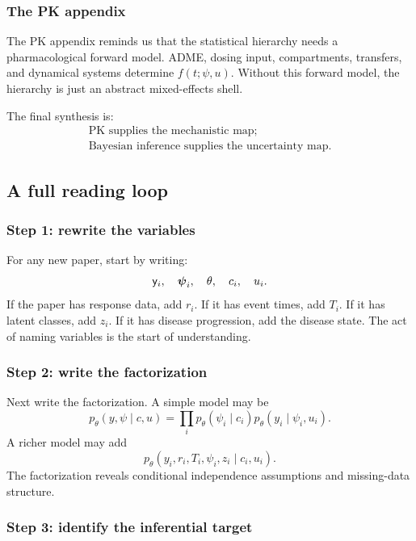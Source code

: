\subsubsection*{The PK appendix}

The PK appendix reminds us that the statistical hierarchy needs a pharmacological forward model.  ADME, dosing input, compartments, transfers, and dynamical systems determine \(f(t;\psi,u)\).  Without this forward model, the hierarchy is just an abstract mixed-effects shell.

The final synthesis is:
\[
  \begin{array}{c}
    \text{PK supplies the mechanistic map;}\\
    \text{Bayesian inference supplies the uncertainty map.}
  \end{array}
\]

\subsection{A full reading loop}

\subsubsection*{Step 1: rewrite the variables}

For any new paper, start by writing:
\[
  \mathsf{y}_i,\quad \boldsymbol{\psi}_i,\quad \theta,\quad c_i,\quad u_i.
\]
If the paper has response data, add \(r_i\).  If it has event times, add \(T_i\).  If it has latent classes, add \(z_i\).  If it has disease progression, add the disease state.  The act of naming variables is the start of understanding.

\subsubsection*{Step 2: write the factorization}

Next write the factorization.  A simple model may be
\[
  p_\theta(y,\psi\mid c,u)
  =
  \prod_i p_\theta(\psi_i\mid c_i)p_\theta(y_i\mid\psi_i,u_i).
\]
A richer model may add
\[
  p_\theta(y_i,r_i,T_i,\psi_i,z_i\mid c_i,u_i).
\]
The factorization reveals conditional independence assumptions and missing-data structure.

\subsubsection*{Step 3: identify the inferential target}

